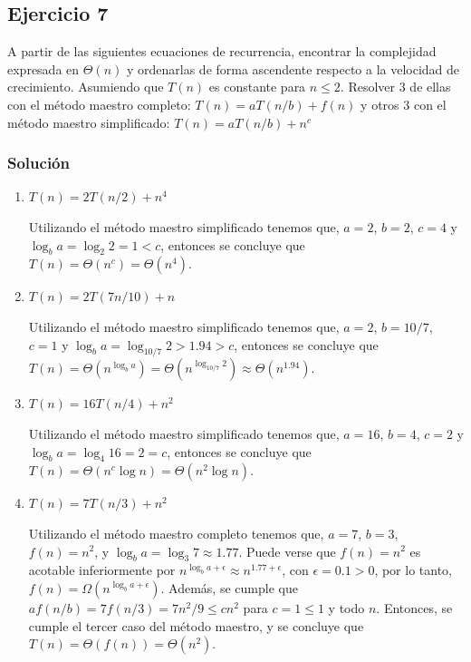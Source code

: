 \documentclass{article}
\begin{document}
\subsection*{Ejercicio 7}
A partir de las siguientes ecuaciones de recurrencia, encontrar la complejidad expresada en $\Theta (n)$ y ordenarlas de forma ascendente respecto a la velocidad de crecimiento. Asumiendo que $T(n)$ es constante para $n \leq 2$. Resolver 3 de ellas con el método maestro completo: $T(n) = a T(n/b) + f(n)$ y otros 3 con el método maestro simplificado: $T(n) = a T(n/b) + n^c$

\subsubsection*{Solución}
\begin{enumerate}[label=\alph*.]
    \item $T(n) = 2T(n/2) + n^4$
    
    Utilizando el método maestro simplificado tenemos que, $a=2$, $b=2$, $c=4$ y $\log_b a = \log_2 2 = 1 < c$, entonces se concluye que $T(n) = \Theta (n^c) = \Theta (n^4)$.


    \item $T(n) = 2T(7n/10) + n$
    
    Utilizando el método maestro simplificado tenemos que, $a=2$, $b=10/7$, $c=1$ y $\log_b a = \log_{10/7} 2 > 1.94 > c$, entonces se concluye que $T(n) = \Theta (n^{\log_b a}) = \Theta (n^{\log_{10/7} 2}) \approx \Theta (n^{1.94})$.

    
    \item $T(n) = 16T(n/4) + n^2$
    
    Utilizando el método maestro simplificado tenemos que, $a=16$, $b=4$, $c=2$ y $\log_b a = \log_4 16 = 2 = c$, entonces se concluye que $T(n) = \Theta (n^c \log n) = \Theta (n^2 \log n)$.


    \item $T(n) = 7T(n/3) + n^2$
    
    Utilizando el método maestro completo tenemos que, $a=7$, $b=3$, $f(n)=n^2$, y $\log_b a = \log_3 7 \approx 1.77$. Puede verse que $f(n)=n^2$ es acotable inferiormente por $n^{\log_b a + \epsilon} \approx n^{1.77 + \epsilon}$, con $\epsilon = 0.1 > 0$, por lo tanto, $f(n) = \Omega (n^{\log_b a + \epsilon})$. Además, se cumple que $af(n/b) = 7f(n/3) = 7 n^2 / 9 \leq c n^2$ para $c = 1 \leq 1$ y todo $n$. Entonces, se cumple el tercer caso del método maestro, y se concluye que $T(n) = \Theta (f(n)) = \Theta (n^2)$.



\end{enumerate}
\end{document}
